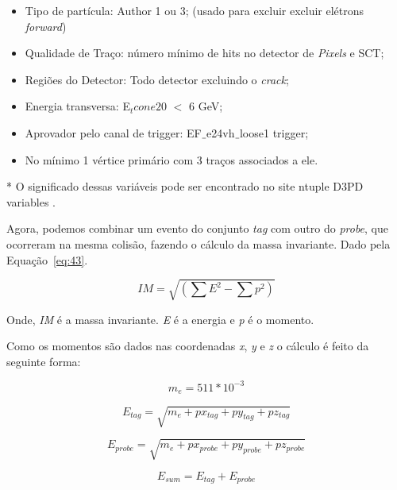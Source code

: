 \begin{itemize}
  \item Tipo de partícula: Author 1 ou 3; (usado para excluir excluir elétrons \emph{forward})
  \item Qualidade de Traço: número mínimo de hits no detector de \emph{Pixels} e SCT;
  \item Regiões do Detector: Todo detector excluindo o \emph{crack};
  \item Energia transversa: E${_tcone20}$  $<$ 6 GeV;
  \item Aprovador pelo canal de trigger: EF$\underline{\hspace{.05in}}$e24vh$\underline{\hspace{.05in}}$loose1 trigger;
  \item No mínimo 1 vértice primário com 3 traços associados a ele.
\end{itemize}

	* O significado dessas variáveis pode ser encontrado no site ntuple D3PD variables \cite{ntupleanalysis}.

	
Agora, podemos combinar um evento do conjunto \emph{tag} com outro do \emph{probe}, que ocorreram na mesma colisão, fazendo o cálculo da massa invariante. Dado pela Equação~\ref{eq:43}.

\begin{equation}\label{eq:43}
  IM = \sqrt {\left( {\sum {{E^2} - \sum {{p^2}} } } \right)}
\end{equation}

Onde, \emph{IM} é a massa invariante. \emph{E} é a energia e \emph{p} é o momento.

Como os momentos são dados nas coordenadas \emph{x}, \emph{y} e \emph{z} o cálculo é feito da seguinte forma:

\begin{equation}\label{eq:44}
  {m_e} = 511*{10^{ - 3}}
\end{equation}

\begin{equation}\label{eq:45}
  {E_{tag}} = \sqrt {{m_e} + p{x_{tag}} + p{y_{tag}} + p{z_{tag}}}
\end{equation}

\begin{equation}\label{eq:46}
  {E_{probe}} = \sqrt {{m_e} + p{x_{probe}} + p{y_{probe}} + p{z_{probe}}}
\end{equation}

\begin{equation}\label{eq:47}
  {E_{sum}} = {E_{tag}} + {E_{probe}}
\end{equation}

